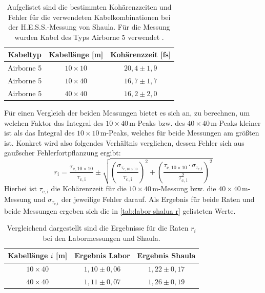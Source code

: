 \begin{table}[h]
    \centering
    \begin{tabular}{|c|c|c|} \hline
        Kabeltyp    & Kabellänge [m] & Kohärenzzeit [fs]  \\\hline
        Airborne 5  & $10\times 10$  & $20{,}4 \pm 1{,}9$ \\\hline
        Airborne 5  & $10\times 40$  & $16{,}7 \pm 1{,}7$ \\\hline
        Airborne 5  & $40\times 40$  & $16{,}2 \pm 2{,}0$ \\\hline
    \end{tabular}
    \caption{Aufgelistet sind die bestimmten Kohärenzzeiten und Fehler für die verwendeten Kabelkombinationen bei der H.E.S.S.-Messung von Shaula. Für die Messung wurden Kabel des Typs Airborne 5 verwendet \cite{zmijaFirstIntensityInterferometry2023}.}
    \label{tab:Kohärenzzeiten Shaula}
\end{table}
Für einen Vergleich der beiden Messungen bietet es sich an, zu berechnen, um welchen Faktor das Integral des $10\times 40\,\mathrm{m}$-Peaks bzw. des $40\times 40\,\mathrm{m}$-Peaks kleiner ist als das Integral des $10\times 10\,\mathrm{m}$-Peaks, welches für beide Messungen am größten ist. 
Konkret wird also folgendes Verhältnis verglichen, dessen Fehler sich aus gaußscher Fehlerfortpflanzung ergibt:
\begin{equation}
    r_i = \frac{\tau_{\mathrm{c,10\times10}}}{\tau_{\mathrm{c,i}}} \pm \sqrt{\left(\frac{\sigma_{\tau_\mathrm{{c,10\times10}}}}{\tau_{\mathrm{c,i}}}\right)^2 + \left(\frac{\tau_{\mathrm{c,10\times10}} \cdot \sigma_{\tau_{\mathrm{c,i}}}}{\tau_{\mathrm{c,i}}^2}\right)^2}
\end{equation}
Hierbei ist $\tau_{\mathrm{c,i}}$ die Kohärenzzeit für die $10\times 40\,\mathrm{m}$-Messung bzw. die $40\times 40\,\mathrm{m}$-Messung und $\sigma_{\tau_{\mathrm{c,i}}}$ der jeweilige Fehler darauf. 
Als Ergebnis für beide Raten und beide Messungen ergeben sich die in \autoref{tab:labor shalua r} gelisteten Werte. 
\begin{table}[h]
    \centering
    \begin{tabular}{|c|c|c|}\hline
        Kabellänge $i$ [m]       & Ergebnis Labor      & Ergebnis Shaula     \\\hline
        $10\times 40$            & $1{,}10 \pm 0{,}06$ & $1{,}22 \pm 0{,}17$ \\\hline
        $40\times 40$            & $1{,}11 \pm 0{,}07$ & $1{,}26 \pm 0{,}19$ \\\hline
    \end{tabular}
    \caption{Vergleichend dargestellt sind die Ergebnisse für die Raten $r_i$ bei den Labormessungen und Shaula.}
    \label{tab:labor shalua r}
\end{table}
